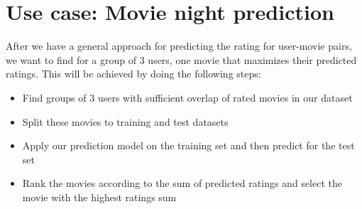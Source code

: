 \section{Use case: Movie night prediction}
After we have a general approach for predicting the rating for user-movie pairs, we want to find for a group of 3 users, one movie that maximizes their predicted ratings. This will be achieved by doing the following steps:
 \begin{itemize}
 \item Find groups of 3 users with sufficient overlap of rated movies in our dataset
 \item Split these movies to training and test datasets
 \item Apply our prediction model on the training set and then predict for the test set
 \item Rank the movies according to the sum of predicted ratings and select the movie with the highest ratings sum
 \end{itemize}